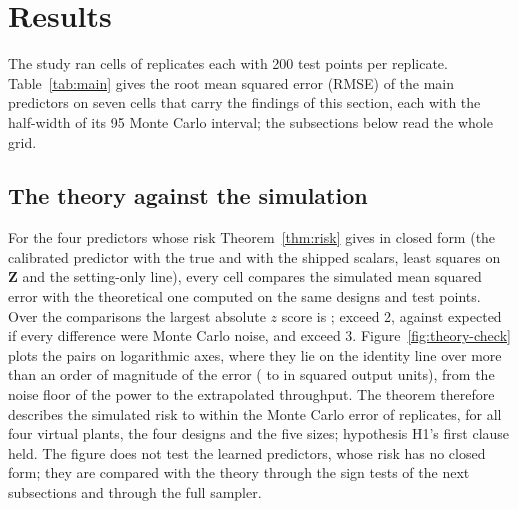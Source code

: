 \section{Results}\label{sec:results}

The study ran \cellsTotal{} cells of \repsPerCell{} replicates each with 200 test points per replicate.
Table~\ref{tab:main} gives the root mean squared error (RMSE) of the main predictors on seven cells that carry the findings
of this section, each with the half-width of its 95\pct{} Monte Carlo interval; the subsections below read the whole grid.

\begin{table}[!t]
\caption{Root mean squared error, with the half-width of the 95\pct{} Monte Carlo interval, of five predictors on seven cells
of the closed-form study: power (kW) on V0 and V1, throughput (t/h) on V2 and on the capacity study with the engine of the form of
Rocha et al.; \repsPerCell{} replicates of 200 test points each. Lower is better.}
\label{tab:main}
\centering\footnotesize

\end{table}

\subsection{The theory against the simulation}\label{sec:results-theory}

For the four predictors whose risk Theorem~\ref{thm:risk} gives in closed form (the calibrated predictor with the true and
with the shipped scalars, least squares on $\mathbf Z$ and the setting-only line), every cell compares the simulated mean
squared error with the theoretical one computed on the same designs and test points. Over the \zNum{} comparisons the largest
absolute $z$ score is \zMax; \zOverTwo{} exceed 2, against \zExpectTwo{} expected if every difference were Monte Carlo noise,
and \zOverThree{} exceed 3. Figure~\ref{fig:theory-check} plots the pairs on logarithmic axes, where they lie on the identity
line over more than an order of magnitude of the error (\theoryMseLo{} to \theoryMseHi{} in squared output units), from the
noise floor of the power to the extrapolated throughput. The
theorem therefore describes the simulated risk to within the Monte Carlo error of \repsPerCell{} replicates, for all four virtual
plants, the four designs and the five sizes; hypothesis H1's first clause held. The figure does not test the learned
predictors, whose risk has no closed form; they are compared with the theory through the sign tests of the next
subsections and through the full sampler.

